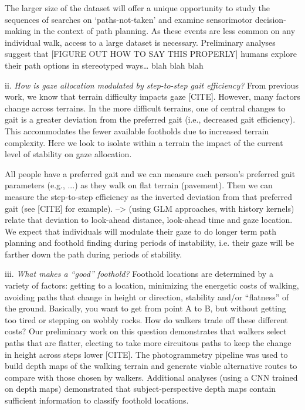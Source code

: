 The larger size of the dataset will offer a unique opportunity to study the sequences of searches on `paths-not-taken' and examine sensorimotor decision-making in the context of path planning. As these events are less common on any individual walk, access to a large dataset is necessary. Preliminary analyses suggest that [FIGURE OUT HOW TO SAY THIS PROPERLY] humans explore their path options in stereotyped ways\ldots{} blah blah blah

ii. \emph{How is gaze allocation modulated by step-to-step gait
efficiency?} From previous work, we know that terrain difficulty impacts gaze [CITE]. However, many factors change across terrains. In the more difficult terrains, one of central changes to gait is a greater deviation from the preferred gait (i.e., decreased gait efficiency). This accommodates the fewer available footholds due to increased terrain complexity. Here we look to isolate within a terrain the impact of the current level of stability on gaze allocation.

All people have a preferred gait and we can measure each person's preferred gait parameters (e.g., ...) as they walk on flat terrain (pavement). Then we can measure the step-to-step efficiency as the inverted deviation from that preferred gait (see [CITE] for example).  --> (using GLM approaches, with history kernels) relate that deviation to look-ahead distance, look-ahead time and gaze location. We expect that individuals will modulate their gaze to do longer term path planning and foothold finding during periods of instability, i.e. their gaze will be farther down the path during periods of stability.

iii. \emph{What makes a ``good'' foothold?} Foothold locations are
determined by a variety of factors: getting to a location, minimizing the energetic costs of walking, avoiding paths that change in height or direction, stability and/or ``flatness'' of the ground. Basically, you want to get from point A to B, but without getting too tired or stepping on wobbly rocks. How do walkers trade off these different costs? Our preliminary work on this question demonstrates that walkers select paths that are flatter, electing to take more circuitous paths to keep the change in height across steps lower [CITE]. The photogrammetry pipeline was used to build depth maps of the walking terrain and generate viable alternative routes to compare with those chosen by walkers. Additional analyses (using a CNN trained on depth maps) demonstrated that subject-perspective depth maps contain sufficient information to classify foothold locations.

